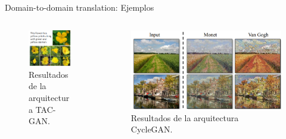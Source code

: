 \begin{frame}{Domain-to-domain translation: Ejemplos}

    \begin{columns}[T]
    \begin{column}{.48\textwidth}
    
    \begin{figure}
        \centering
        \includegraphics[width=\textwidth]{Slides/figures/GAN/TAC-GAN.PNG}
        \caption{Resultados de la arquitectura TAC-GAN\cite{dash2017tac}.}
    \end{figure}
    
    \end{column}
    \hfill
    \begin{column}{.55\textwidth}
    
    \begin{figure}
        \centering
        \includegraphics[width=\textwidth]{Slides/figures/GAN/CycleGAN.PNG}
        \caption{Resultados de la arquitectura CycleGAN\cite{zhu2017unpaired}.}
    \end{figure}

    \end{column}
    \end{columns}

\end{frame}

